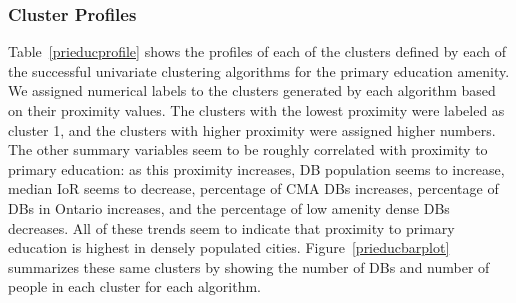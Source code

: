 \documentclass[11pt, a4paper]{article}
\begin{document}
\justifying
\subsubsection{Cluster Profiles}


Table~\ref{prieducprofile} shows the profiles of each of the clusters defined by each of the successful univariate clustering algorithms for the primary education amenity. We assigned numerical labels to the clusters generated by each algorithm based on their proximity values. The clusters with the lowest proximity were labeled as cluster 1, and the clusters with higher proximity were assigned higher numbers. The other summary variables seem to be roughly correlated with proximity to primary education: as this proximity increases, DB population seems to increase, median IoR seems to decrease, percentage of CMA DBs increases, percentage of DBs in Ontario increases, and the percentage of low amenity dense DBs decreases. All of these trends seem to indicate that proximity to primary education is highest in densely populated cities. Figure~\ref{prieducbarplot} summarizes these same clusters by showing the number of DBs and number of people in each cluster for each algorithm.
\end{document}
